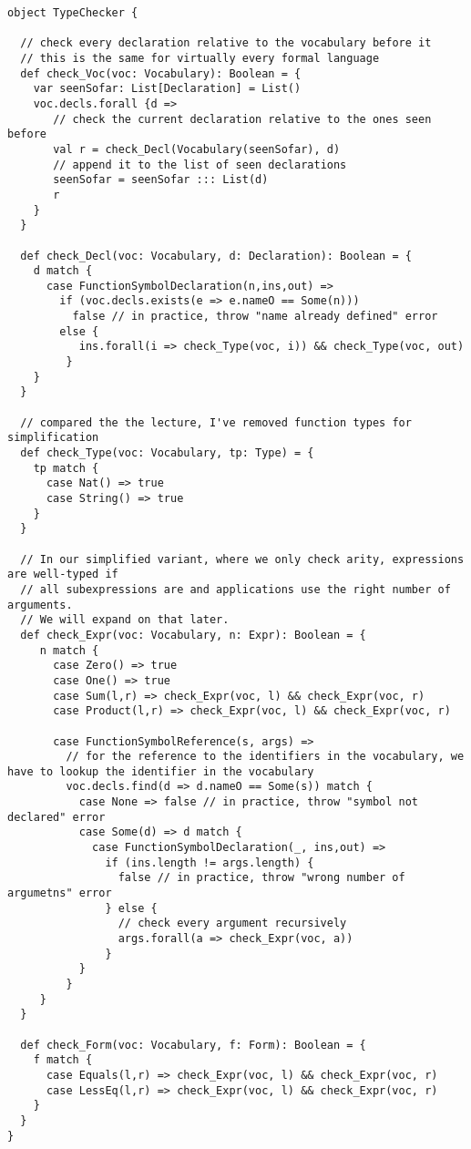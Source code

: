 \begin{lstlisting}
object TypeChecker {
  
  // check every declaration relative to the vocabulary before it
  // this is the same for virtually every formal language
  def check_Voc(voc: Vocabulary): Boolean = {
    var seenSofar: List[Declaration] = List()
    voc.decls.forall {d =>
       // check the current declaration relative to the ones seen before
       val r = check_Decl(Vocabulary(seenSofar), d)
       // append it to the list of seen declarations
       seenSofar = seenSofar ::: List(d)
       r
    }
  }
  
  def check_Decl(voc: Vocabulary, d: Declaration): Boolean = {
    d match {
      case FunctionSymbolDeclaration(n,ins,out) =>
        if (voc.decls.exists(e => e.nameO == Some(n)))
          false // in practice, throw "name already defined" error
        else {
           ins.forall(i => check_Type(voc, i)) && check_Type(voc, out)
         }
    }
  }

  // compared the the lecture, I've removed function types for simplification
  def check_Type(voc: Vocabulary, tp: Type) = {
    tp match {
      case Nat() => true
      case String() => true
    }
  }

  // In our simplified variant, where we only check arity, expressions are well-typed if
  // all subexpressions are and applications use the right number of arguments.
  // We will expand on that later.
  def check_Expr(voc: Vocabulary, n: Expr): Boolean = {
     n match {
       case Zero() => true
       case One() => true
       case Sum(l,r) => check_Expr(voc, l) && check_Expr(voc, r)
       case Product(l,r) => check_Expr(voc, l) && check_Expr(voc, r)
       
       case FunctionSymbolReference(s, args) =>
         // for the reference to the identifiers in the vocabulary, we have to lookup the identifier in the vocabulary
         voc.decls.find(d => d.nameO == Some(s)) match {
           case None => false // in practice, throw "symbol not declared" error
           case Some(d) => d match {
             case FunctionSymbolDeclaration(_, ins,out) =>
               if (ins.length != args.length) {
                 false // in practice, throw "wrong number of argumetns" error
               } else {
                 // check every argument recursively
                 args.forall(a => check_Expr(voc, a))
               }
           }
         }
     }
  }
  
  def check_Form(voc: Vocabulary, f: Form): Boolean = {
    f match {
      case Equals(l,r) => check_Expr(voc, l) && check_Expr(voc, r)
      case LessEq(l,r) => check_Expr(voc, l) && check_Expr(voc, r)
    }
  }
}
\end{lstlisting}

